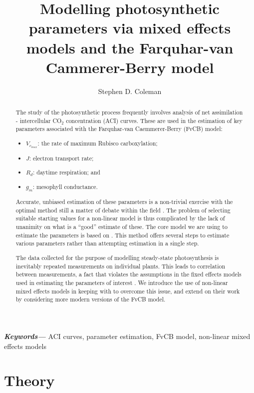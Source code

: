 \documentclass[11pt]{article} %
\title{Modelling photosynthetic parameters via mixed effects models and the Farquhar-van Cammerer-Berry model}
\author{Stephen D. Coleman}
\providecommand{\keywords}[1]
{
  \small	
  \textbf{\textit{Keywords---}} #1
}
\begin{document}
 \pgfplotsset{compat=1.16}
\maketitle

\begin{abstract}
The study of the photosynthetic process frequently involves analysis of net assimilation - intercellular CO$_2$ concentration (ACI) curves. These are used in the estimation of key parameters associated with the Farquhar-van Caemmerer-Berry (FvCB) \cite{Farquharbiochemicalmodelphotosynthetic1980} model:
\begin{itemize}
 \item $V_{c_{max}}$: the rate of maximum Rubisco carboxylation;
 \item $J$: electron transport rate;
 \item $R_d$: daytime respiration; and
 \item $g_m$: mesophyll conductance.
\end{itemize}
Accurate, unbiased estimation of these parameters is a non-trivial exercise with the optimal method still a matter of debate within the field \cite{Moualeu-Nganguenewmethodestimate2017}\cite{YinTheoreticalreconsiderationswhen2009}\cite{QianEstimationphotosynthesisparameters2012}. The problem of selecting suitable starting values for a non-linear model is thus complicated by the lack of unanimity on what is a ``good'' estimate of these. The core model we are using to estimate the parameters is based on \citet{YinUsingcombinedmeasurements2009}. This method offers several steps to estimate various parameters rather than attempting estimation in a single step. %

The data collected for the purpose of modelling steady-state photosynthesis is inevitably repeated measurements on individual plants. This leads to correlation between measurements, a fact that violates the assumptions in the fixed effects models used in estimating the parameters of interest \cite{DuursmaPlantecophysPackageAnalysing2015}\cite{BellasioExceltoolderiving2016}. We introduce the use of non-linear mixed effects models in keeping with \citet{QianEstimationphotosynthesisparameters2012} to overcome this issue, and extend on their work by considering more modern versions of the FvCB model.
\end{abstract}
\keywords{ACI curves, parameter estimation, FvCB model, non-linear mixed effects models}

\section{Theory}
\end{document}
